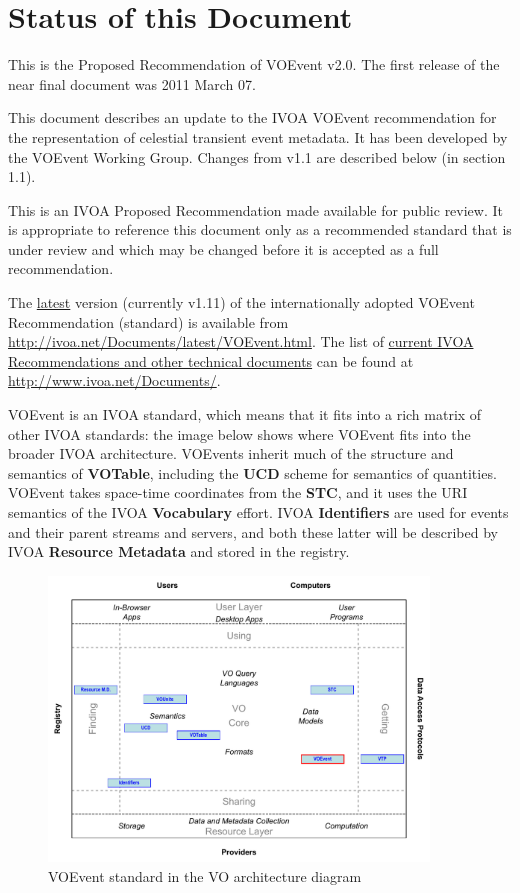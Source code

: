 \documentclass[11pt,a4paper]{ivoa}
\begin{document}
\section*{Status of this Document}
This is the Proposed Recommendation of VOEvent v2.0. The first release of the near final document was 2011 March 07.

This document describes an update to the IVOA VOEvent recommendation for the representation of celestial transient event metadata. It has been developed by the VOEvent Working Group. Changes from v1.1 are described below (in section 1.1). 

This is an IVOA Proposed Recommendation made available for public review. It is appropriate to reference this document only as a recommended standard that is under review and which may be changed before it is accepted as a full recommendation.


The \href{http://ivoa.net/Documents/latest/VOEvent.html}{latest} version (currently v1.11) of the internationally adopted VOEvent Recommendation (standard) is available from \url{http://ivoa.net/Documents/latest/VOEvent.html}. The list of \href{http://www.ivoa.net/Documents/}{current IVOA Recommendations and other technical documents} can be found at \url{http://www.ivoa.net/Documents/}.

VOEvent is an IVOA standard, which means that it fits into a rich matrix of other IVOA standards: the image below shows where VOEvent fits into the broader IVOA architecture. VOEvents inherit much of the structure and semantics of {\bf VOTable}, including the {\bf UCD} scheme for semantics of quantities. VOEvent takes space-time coordinates from the {\bf STC}, and it uses the URI semantics of the IVOA {\bf Vocabulary} effort. IVOA {\bf Identifiers} are used for events and their parent streams and servers, and both these latter will be described by IVOA {\bf Resource Metadata} and stored in the registry. 

\begin{figure}[ht!]
\centering\includegraphics[width=0.9\textwidth]{role_diagram.pdf}
\caption{VOEvent standard in the VO architecture diagram}
\label{fig:diagram}
\end{figure}
\end{document}
